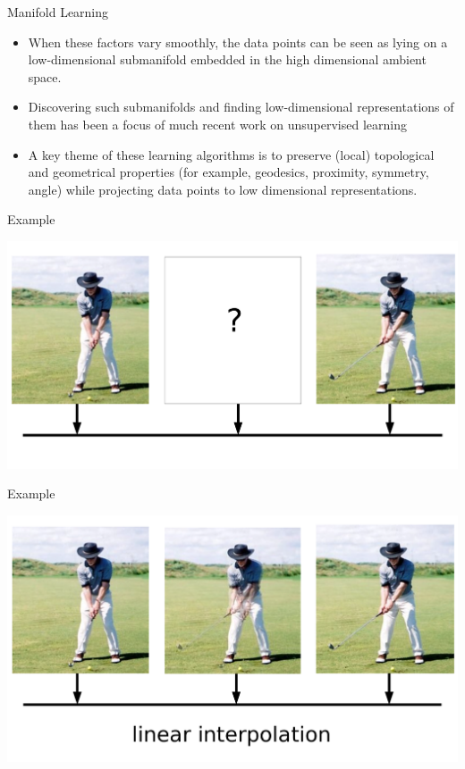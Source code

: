 \documentclass[xcolor={dvipsnames,table}]{beamer}
\begin{document}
\begin{frame}{Manifold Learning}
	\begin{itemize}
		\item When these factors vary smoothly, the data points can be seen as lying on a low-dimensional submanifold embedded in the high dimensional ambient space.
		\item Discovering such submanifolds and finding low-dimensional representations of them has been a focus of much recent work on unsupervised learning 
		\item A key theme of these learning algorithms is to preserve (local) topological and geometrical properties (for example, geodesics, proximity, symmetry, angle) while projecting data points to low dimensional representations.
	\end{itemize}
	
\end{frame}

\begin{frame}{Example}
	\begin{center}
     	\includegraphics[width=\linewidth]{golf.png}
     \end{center}
\end{frame}

\begin{frame}{Example}
	\begin{center}
     	\includegraphics[width=\linewidth]{golfl.png}
     \end{center}
\end{frame}
\end{document}
